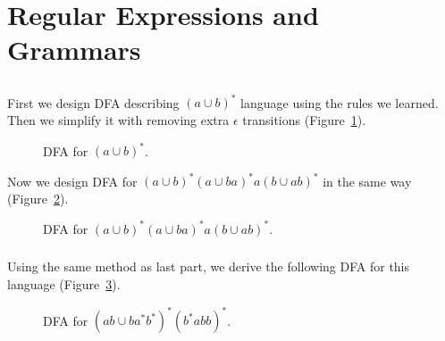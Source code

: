 \documentclass{article}
\numberwithin{equation}{subsection}
\begin{document}
\section{Regular Expressions and Grammars}
\subsection{}
\subsubsection{}
First we design DFA describing \((a\cup b)^*\) language using the rules we learned.
Then we simplify it with removing extra \(\epsilon\) transitions (Figure~\ref{fig:automata3-1-a}).
\begin{figure}[H]
\centering

\caption{DFA for \((a\cup b)^*\).}
\label{fig:automata3-1-a}
\end{figure}
Now we design DFA for \((a\cup b)^*(a\cup ba)^*a(b\cup ab)^*\) in the same way (Figure~\ref{fig:automata3-1-b}).
\begin{figure}[H]
\centering

\caption{DFA for \((a\cup b)^*(a\cup ba)^*a(b\cup ab)^*\).}
\label{fig:automata3-1-b}
\end{figure}

\subsubsection{}
Using the same method as last part, we derive the following DFA for this language (Figure~\ref{fig:automata3-1-c}).
\begin{figure}[H]
\centering

\caption{DFA for \((ab\cup ba^*b^*)^*(b^*abb)^*\).}
\label{fig:automata3-1-c}
\end{figure}

\subsection{}
\end{document}
